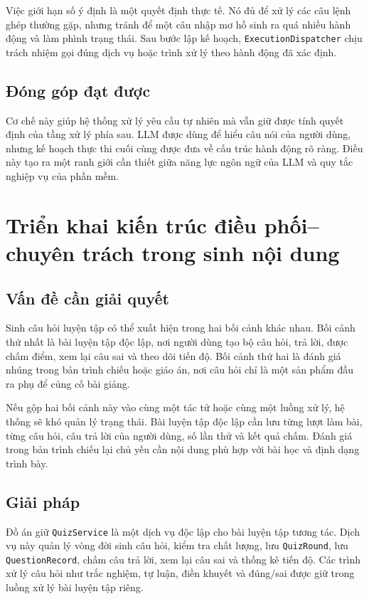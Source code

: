 \documentclass[../DoAn.tex]{subfiles}
\begin{document}
Việc giới hạn số ý định là một quyết định thực tế. Nó đủ để xử lý các câu lệnh ghép thường gặp, nhưng tránh để một câu nhập mơ hồ sinh ra quá nhiều hành động và làm phình trạng thái. Sau bước lập kế hoạch, \texttt{ExecutionDispatcher} chịu trách nhiệm gọi đúng dịch vụ hoặc trình xử lý theo hành động đã xác định.

\subsection{Đóng góp đạt được}

Cơ chế này giúp hệ thống xử lý yêu cầu tự nhiên mà vẫn giữ được tính quyết định của tầng xử lý phía sau. LLM được dùng để hiểu câu nói của người dùng, nhưng kế hoạch thực thi cuối cùng được đưa về cấu trúc hành động rõ ràng. Điều này tạo ra một ranh giới cần thiết giữa năng lực ngôn ngữ của LLM và quy tắc nghiệp vụ của phần mềm.

\section{Triển khai kiến trúc điều phối--chuyên trách trong sinh nội dung}

\subsection{Vấn đề cần giải quyết}

Sinh câu hỏi luyện tập có thể xuất hiện trong hai bối cảnh khác nhau. Bối cảnh thứ nhất là bài luyện tập độc lập, nơi người dùng tạo bộ câu hỏi, trả lời, được chấm điểm, xem lại câu sai và theo dõi tiến độ. Bối cảnh thứ hai là đánh giá nhúng trong bản trình chiếu hoặc giáo án, nơi câu hỏi chỉ là một sản phẩm đầu ra phụ để củng cố bài giảng.

Nếu gộp hai bối cảnh này vào cùng một tác tử hoặc cùng một luồng xử lý, hệ thống sẽ khó quản lý trạng thái. Bài luyện tập độc lập cần lưu từng lượt làm bài, từng câu hỏi, câu trả lời của người dùng, số lần thử và kết quả chấm. Đánh giá trong bản trình chiếu lại chủ yếu cần nội dung phù hợp với bài học và định dạng trình bày.

\subsection{Giải pháp}

Đồ án giữ \texttt{QuizService} là một dịch vụ độc lập cho bài luyện tập tương tác. Dịch vụ này quản lý vòng đời sinh câu hỏi, kiểm tra chất lượng, lưu \texttt{QuizRound}, lưu \texttt{QuestionRecord}, chấm câu trả lời, xem lại câu sai và thống kê tiến độ. Các trình xử lý câu hỏi như trắc nghiệm, tự luận, điền khuyết và đúng/sai được giữ trong luồng xử lý bài luyện tập riêng.
\end{document}
